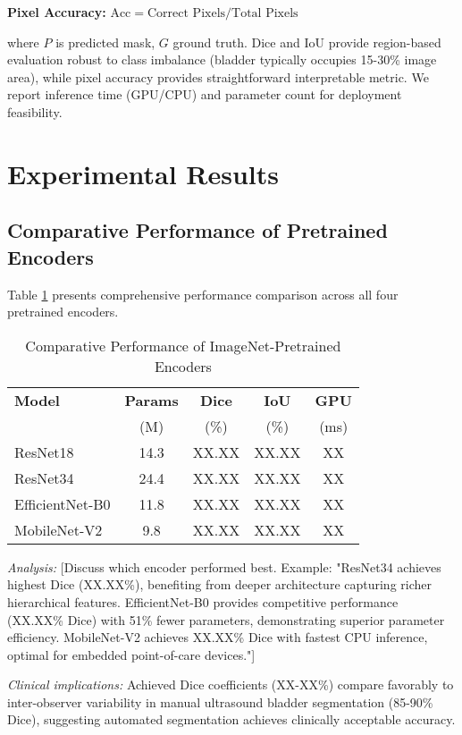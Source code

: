 \documentclass{article}
\begin{document}
\textbf{Pixel Accuracy:} $\text{Acc} = \text{Correct Pixels}/\text{Total Pixels}$

where $P$ is predicted mask, $G$ ground truth. Dice and IoU provide region-based evaluation robust to class imbalance (bladder typically occupies 15-30\% image area), while pixel accuracy provides straightforward interpretable metric. We report inference time (GPU/CPU) and parameter count for deployment feasibility.

\section{Experimental Results}
\label{sec:results}

\subsection{Comparative Performance of Pretrained Encoders}

Table \ref{tab:model_comparison} presents comprehensive performance comparison across all four pretrained encoders.

\begin{table}[t]
\centering
\caption{Comparative Performance of ImageNet-Pretrained Encoders}
\label{tab:model_comparison}
\begin{tabular}{@{}lcccc@{}}
\toprule
\textbf{Model} & \textbf{Params} & \textbf{Dice} & \textbf{IoU} & \textbf{GPU} \\
 & (M) & (\%) & (\%) & (ms) \\
\midrule
ResNet18 & 14.3 & XX.XX & XX.XX & XX \\
ResNet34 & 24.4 & XX.XX & XX.XX & XX \\
EfficientNet-B0 & 11.8 & XX.XX & XX.XX & XX \\
MobileNet-V2 & 9.8 & XX.XX & XX.XX & XX \\
\bottomrule
\end{tabular}
\end{table}

\textit{Analysis:} [Discuss which encoder performed best. Example: "ResNet34 achieves highest Dice (XX.XX\%), benefiting from deeper architecture capturing richer hierarchical features. EfficientNet-B0 provides competitive performance (XX.XX\% Dice) with 51\% fewer parameters, demonstrating superior parameter efficiency. MobileNet-V2 achieves XX.XX\% Dice with fastest CPU inference, optimal for embedded point-of-care devices."]

\textit{Clinical implications:} Achieved Dice coefficients (XX-XX\%) compare favorably to inter-observer variability in manual ultrasound bladder segmentation (85-90\% Dice), suggesting automated segmentation achieves clinically acceptable accuracy.
\end{document}
